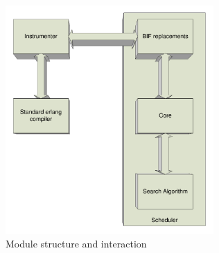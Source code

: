\documentclass[a4paper,10pt]{article}
\begin{document}
\begin{figure}[htb]
	\centering
	\includegraphics[width=300px]{PRA1}
	\caption{Module structure and interaction}
\end{figure}
\end{document}
